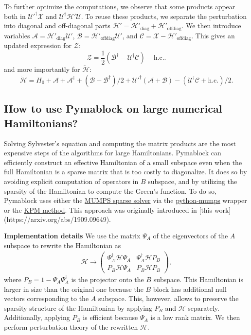 %
To further optimize the computations, we observe that some products appear both in $\mathcal{U}'^\dagger \mathcal{X}$ and $\mathcal{U}^\dagger \mathcal{H}' \mathcal{U}$.
%
To reuse these products, we separate the perturbation into diagonal and off-diagonal parts $\mathcal{H}' = \mathcal{H}'_\textrm{diag} + \mathcal{H}'_\textrm{offdiag}$.
%
We then introduce variables $\mathcal{A} = \mathcal{H}'_\textrm{diag} \mathcal{U}'$, $\mathcal{B} = \mathcal{H}'_\textrm{offdiag} \mathcal{U}'$, and $\mathcal{C} = \mathcal{X} -
\mathcal{H}'_\textrm{offdiag}$.
This gives an updated expression for $\mathcal{Z}$:
%
$$
\mathcal{Z} = \frac{1}{2}(\mathcal{B}^\dagger - \mathcal{U}^\dagger\mathcal{C}) - \textrm{h.c.}.
$$
%
and more importantly for $\tilde{\mathcal{H}}$:
%
$$
\tilde{\mathcal{H}} = H_0 + \mathcal{A} + \mathcal{A}^\dagger + (\mathcal{B} + \mathcal{B}^\dagger)/2 + \mathcal{U}'^\dagger (\mathcal{A} + \mathcal{B}) - (\mathcal{U}^\dagger \mathcal{C} + \textrm{h.c.})/2.
$$

\subsection{How to use Pymablock on large numerical Hamiltonians?}
Solving Sylvester's equation and computing the matrix products are the most
expensive steps of the algorithms for large Hamiltonians.
Pymablock can efficiently construct an effective Hamiltonian of a small
subspace even when the full Hamiltonian is a sparse matrix that is too costly to
diagonalize.
It does so by avoiding explicit computation of operators in $B$ subspace, and by
utilizing the sparsity of the Hamiltonian to compute the Green's function. To do so,
Pymablock uses either the
\href{https://mumps-solver.org/}{MUMPS sparse solver} via the
\href{https://gitlab.kwant-project.org/kwant/python-mumps/}{python-mumps} wrapper or the
\href{https://doi.org/10.1103/RevModPhys.78.275}{KPM method}.
This approach was originally introduced in [this
work](https://arxiv.org/abs/1909.09649).

\textbf{Implementation details}
We use the matrix $\Psi_A$ of the eigenvectors of the $A$ subspace to rewrite
the Hamiltonian as
%
\begin{align}
\mathcal{H} \to \begin{pmatrix}
\Psi_A^\dagger \mathcal{H} \Psi_A & \Psi_A^\dagger \mathcal{H} P_B \\
P_B \mathcal{H} \Psi_A & P_B \mathcal{H} P_B
\end{pmatrix},
\end{align}
%
where $P_B = 1 - \Psi_A \Psi_A^\dagger$ is the projector onto the $B$ subspace.
This Hamiltonian is larger in size than the original one because the $B$ block has
additional null vectors corresponding to the $A$ subspace.
This, however, allows to preserve the sparsity structure of the Hamiltonian by applying
$P_B$ and $\mathcal{H}$ separately.
Additionally, applying $P_B$ is efficient because $\Psi_A$ is a low rank matrix.
We then perform perturbation theory of the rewritten $\mathcal{H}$.

